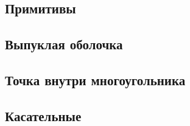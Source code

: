 \subsection{Примитивы}

\subsection{Выпуклая оболочка}

\subsection{Точка внутри многоугольника}

\subsection{Касательные}
